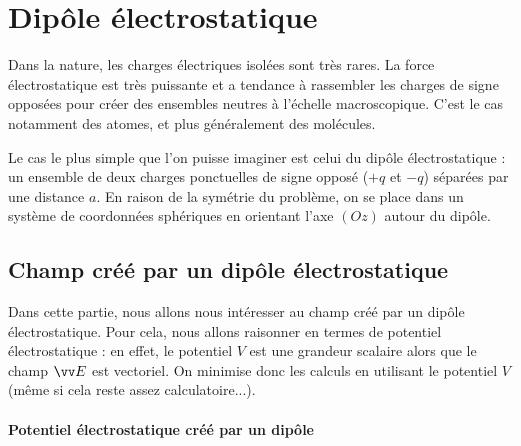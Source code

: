 \documentclass[11pt,fleqn]{book} %
\begin{document}
\section{Dipôle électrostatique}

Dans la nature, les charges électriques isolées sont très rares. La force électrostatique est très puissante et a tendance à rassembler les charges de signe opposées pour créer des ensembles neutres à l'échelle macroscopique. C'est le cas notamment des atomes, et plus généralement des molécules.

Le cas le plus simple que l'on puisse imaginer est celui du dipôle électrostatique : un ensemble de deux charges ponctuelles de signe opposé ($+q$ et $-q$) séparées par une distance $a$. En raison de la symétrie du problème, on se place dans un système de coordonnées sphériques en orientant l'axe $(Oz)$ autour du dipôle.

\subsection{Champ créé par un dipôle électrostatique}

Dans cette partie, nous allons nous intéresser au champ créé par un dipôle électrostatique. Pour cela, nous allons raisonner en termes de potentiel électrostatique : en effet, le potentiel $V$ est une grandeur scalaire alors que le champ $\vv E$ est vectoriel. On minimise donc les calculs en utilisant le potentiel $V$ (même si cela reste assez calculatoire...).

\paragraph{Potentiel électrostatique créé par un dipôle}
\end{document}
